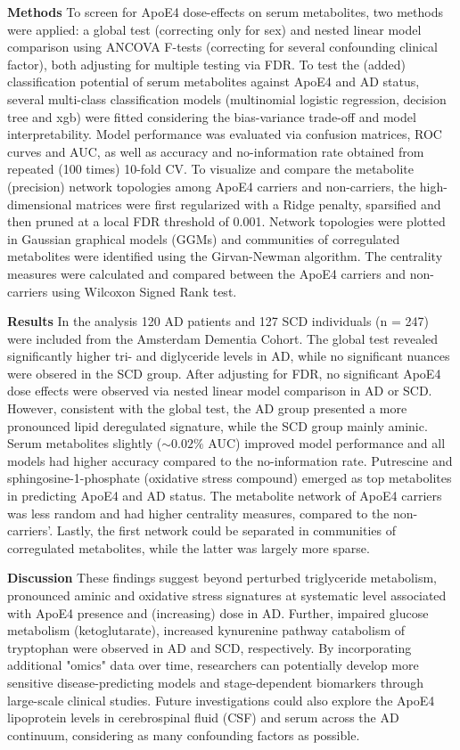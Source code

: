 \documentclass{amsart}
\begin{document}
\textbf{Methods}\hspace{.1cm} To screen for ApoE4 dose-effects on serum metabolites, two methods were applied: a global test (correcting only for sex) and nested linear model comparison using ANCOVA F-tests (correcting for several confounding clinical factor), both adjusting for multiple testing via FDR. To test the (added) classification potential of serum metabolites against ApoE4 and AD status, several multi-class classification models (multinomial logistic regression, decision tree and \acrlong{xgb}) were fitted considering the bias-variance trade-off and model interpretability. Model performance was  evaluated via confusion matrices, ROC curves and AUC, as well as accuracy and no-information rate obtained from repeated (100 times) 10-fold CV. To visualize and compare the metabolite (precision) network topologies among ApoE4 carriers and non-carriers, the high-dimensional matrices were first regularized with a Ridge penalty, sparsified and then pruned at a local FDR threshold of 0.001. Network topologies were plotted in Gaussian graphical models (GGMs) and communities of corregulated metabolites were identified using the Girvan-Newman algorithm. The centrality measures were calculated and compared between the ApoE4 carriers and non-carriers using Wilcoxon Signed Rank test.

\textbf{Results}\hspace{.1cm} 
In the analysis 120 AD patients and 127 SCD individuals (n = 247) were included from the Amsterdam Dementia Cohort. The global test revealed significantly higher tri- and diglyceride levels in AD, while no significant nuances were obsered in the SCD group. After adjusting for FDR, no significant ApoE4 dose effects were observed via nested linear model comparison in AD or SCD. However, consistent with the global test, the AD group presented a more pronounced lipid deregulated signature, while the SCD group mainly aminic. Serum metabolites slightly ($\sim0.02\%$ AUC) improved model performance and all models had higher accuracy compared to the no-information rate. Putrescine and sphingosine-1-phosphate (oxidative stress compound) emerged as top metabolites in predicting ApoE4 and AD status. The metabolite network of ApoE4 carriers was less random and had higher centrality measures, compared to the non-carriers'. Lastly, the first network could be separated in communities of corregulated metabolites, while the latter was largely more sparse.

\textbf{Discussion}\hspace{.1cm} These findings suggest beyond perturbed triglyceride metabolism, pronounced aminic and oxidative stress signatures at systematic level associated with ApoE4 presence and (increasing) dose in AD. Further, impaired glucose metabolism (ketoglutarate), increased kynurenine pathway catabolism of tryptophan were observed in AD and SCD, respectively. By incorporating additional "omics" data over time, researchers can potentially develop more sensitive disease-predicting models and stage-dependent biomarkers through large-scale clinical studies. Future investigations could also explore the ApoE4 lipoprotein levels in cerebrospinal fluid (CSF) and serum across the AD continuum, considering as many confounding factors as possible.
\end{document}
